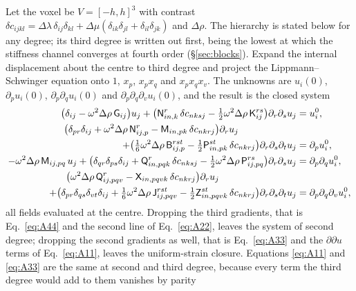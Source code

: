 \documentclass[preprint,review,12pt]{elsarticle}
\begin{document}
Let the voxel be $V=[-h,h]^3$ with contrast
$\delta c_{ijkl}=\Delta\lambda\,\delta_{ij}\delta_{kl}+\Delta\mu(\delta_{ik}\delta_{jl}+\delta_{il}\delta_{jk})$
and $\Delta\rho$. The hierarchy is stated below for any degree; its third degree is written out
first, being the lowest at which the stiffness channel converges at fourth order (\S\ref{sec:blocks}).
Expand the internal displacement about the centre to third degree and project the
Lippmann--Schwinger equation onto $1$, $x_p$, $x_px_q$ and $x_px_qx_v$. The unknowns are $u_i(0)$,
$\partial_pu_i(0)$, $\partial_p\partial_qu_i(0)$ and $\partial_p\partial_q\partial_vu_i(0)$, and the
result is the closed system
\begin{align}
\bigl(\delta_{ij}-\omega^2\Delta\rho\,\mathsf G_{ij}\bigr)u_j
  +\bigl(\mathsf N^{r}_{in,k}\,\delta c_{nksj}-\tfrac12\omega^2\Delta\rho\,\mathsf K^{rs}_{ij}\bigr)
  \partial_r\partial_su_j
  &= u^0_i, \label{eq:A11}\\
\bigl(\delta_{pr}\delta_{ij}+\omega^2\Delta\rho\,\mathsf N^{r}_{ij,p}
  -\mathsf M_{in,pk}\,\delta c_{nkrj}\bigr)\partial_ru_j\qquad\qquad\qquad& \notag\\
  +\bigl(\tfrac16\omega^2\Delta\rho\,\mathsf B^{rst}_{ij,p}
  -\tfrac12\mathsf P^{st}_{in,pk}\,\delta c_{nkrj}\bigr)\partial_r\partial_s\partial_tu_j
  &= \partial_pu^0_i, \label{eq:A22}\\
-\omega^2\Delta\rho\,\mathsf M_{ij,pq}\,u_j
  +\bigl(\delta_{qr}\delta_{ps}\delta_{ij}+\mathsf Q^{r}_{in,pqk}\,\delta c_{nksj}
  -\tfrac12\omega^2\Delta\rho\,\mathsf P^{rs}_{ij,pq}\bigr)\partial_r\partial_su_j
  &= \partial_p\partial_qu^0_i, \label{eq:A33}\\
\bigl(\omega^2\Delta\rho\,\mathsf Q^{r}_{ij,pqv}-\mathsf X_{in,pqvk}\,\delta c_{nkrj}\bigr)\partial_ru_j
  \qquad\qquad\qquad\qquad& \notag\\
  +\bigl(\delta_{pr}\delta_{qs}\delta_{vt}\delta_{ij}+\tfrac16\omega^2\Delta\rho\,\mathsf J^{rst}_{ij,pqv}
  -\tfrac12\mathsf Z^{st}_{in,pqvk}\,\delta c_{nkrj}\bigr)\partial_r\partial_s\partial_tu_j
  &= \partial_p\partial_q\partial_vu^0_i, \label{eq:A44}
\end{align}
all fields evaluated at the centre. Dropping the third gradients, that is Eq.~\eqref{eq:A44} and the
second line of Eq.~\eqref{eq:A22}, leaves the system of second degree; dropping the second gradients
as well, that is Eq.~\eqref{eq:A33} and the $\partial\partial u$ terms of Eq.~\eqref{eq:A11}, leaves
the uniform-strain closure. Equations \eqref{eq:A11} and \eqref{eq:A33} are the same at second and
third degree, because every term the third degree would add to them vanishes by parity
\end{document}
